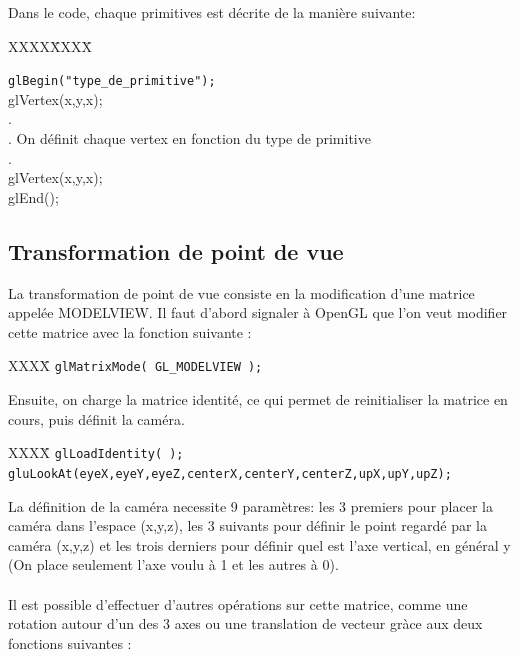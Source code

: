 \documentclass{report}
\begin{document}
Dans le code, chaque primitives est décrite de la manière suivante:


\begin{tabbing}
XXXX\=XXXX\= \kill

\> \verb|glBegin("type_de_primitive");| \\
\> \> glVertex(x,y,x);\\
\> \> . \\
\> \> . On définit chaque vertex en fonction du type de primitive\\
\> \> . \\
\> \> glVertex(x,y,x);\\
\> glEnd();
\end{tabbing}

\subsection{Transformation de point de vue}
La transformation de point de vue consiste en la modification d'une matrice appelée MODELVIEW. Il faut d'abord signaler à OpenGL que l'on veut modifier cette matrice avec la fonction suivante :

\begin{tabbing}
XXXX\= \kill
\> \verb|glMatrixMode( GL_MODELVIEW );|
\end{tabbing}

Ensuite, on charge la matrice identité, ce qui permet de reinitialiser la matrice en cours, puis définit la caméra.

\begin{tabbing}
XXXX\= \kill
\> \verb|glLoadIdentity( );| \\
\> \verb|gluLookAt(eyeX,eyeY,eyeZ,centerX,centerY,centerZ,upX,upY,upZ);|
\end{tabbing}

La définition de la caméra necessite 9 paramètres: les 3 premiers pour placer la caméra dans l'espace (x,y,z), les 3 suivants pour définir le point regardé par la caméra (x,y,z) et les trois derniers pour définir quel est l'axe vertical, en général y (On place seulement l'axe voulu à 1 et les autres à 0).\\\\

Il est possible d'effectuer d'autres opérations sur cette matrice, comme une rotation autour d'un des 3 axes ou une translation de vecteur gràce aux deux fonctions suivantes :
\end{document}

